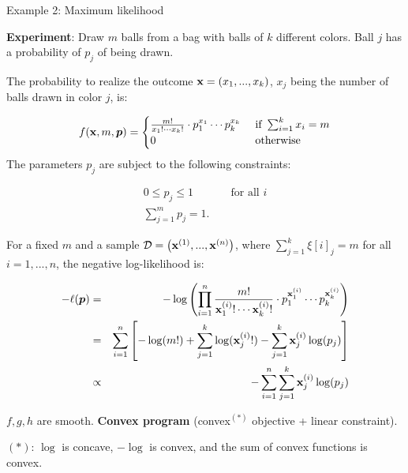 \begin{vbframe}{Example 2: Maximum likelihood}

\textbf{Experiment}: Draw $m$ balls from a bag with balls of $k$ different colors. Ball $j$ has a probability of $p_j$ of being drawn. 

\lz 

The probability to realize the outcome $\xv = (x_1, ..., x_k)$, $x_j$ being the number of balls drawn in color $j$, is: 

$$
	f(\xv, m, \bm{p}) = \begin{cases} \frac{m!}{x_1! \cdots x_k!} \cdot p_1^{x_1} \cdots p_k^{x_k} & \text{ if } \sum_{i = 1}^k x_i = m \\ 0 & \text{ otherwise}\end{cases}
$$
The parameters $p_j$ are subject to the following constraints: 

\begin{eqnarray*}
	0 \le p_j \le 1 && \text{ for all } i \\
	 \sum_{j = 1}^m p_j = 1. &&
\end{eqnarray*}

\framebreak 

For a fixed $m$ and a sample $\D = \left(\xi[1], ..., \xi[n]\right)$, where $\sum_{j = 1}^k \xi[i]_j = m$ for all $i = 1, ..., n$, the negative log-likelihood is: 


\begin{eqnarray*}
	- \ell(\bm{p}) &=& - \log \left(\prod_{i = 1}^n  \frac{m!}{\xi_1! \cdots \xi_k!} \cdot p_1^{\xi_1} \cdots p_k^{\xi_k}    \right) \\
	&=& \sumin \left[- \log(m!) + \sum_{j = 1}^k \log(\xi_j!) - \sum_{j = 1}^k \xi_j \log(p_j)\right] \\
	&\propto& - \sumin \sum_{j = 1}^k \xi_j \log(p_j) 
\end{eqnarray*}

$f, g, h$ are smooth. \textbf{Convex program} (convex$^{(*)}$ objective + linear constraint). 

\vfill
\begin{footnotesize}
${(*)}$: $\log$ is concave, $- \log $ is convex, and the sum of convex functions is convex. 
\end{footnotesize}

\end{vbframe}




	
